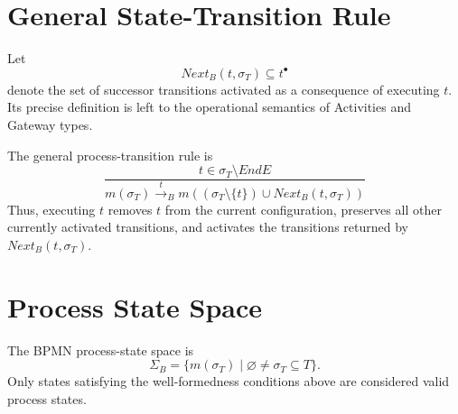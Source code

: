 \documentclass[11pt,a4paper]{article}
\newcommand{\EndE}{\mathit{EndE}}
\newcommand{\NextB}{\mathit{Next}_{B}}
\begin{document}
\section{General State-Transition Rule}

Let
\[
\boxed{
\NextB(t,\sigma_T)\subseteq t^{\bullet}
}
\]
denote the set of successor transitions activated as a consequence of executing $t$. Its precise definition is left to the operational semantics of Activities and Gateway types.

The general process-transition rule is
\[
\boxed{
\frac{t\in\sigma_T\setminus\EndE}
{m(\sigma_T)
\xrightarrow{\;t\;}_{B}
 m\!\left((\sigma_T\setminus\{t\})\cup\NextB(t,\sigma_T)\right)}
}
\tag{EXEC}
\]
Thus, executing $t$ removes $t$ from the current configuration, preserves all other currently activated transitions, and activates the transitions returned by $\NextB(t,\sigma_T)$.

\section{Process State Space}

The BPMN process-state space is
\[
\boxed{
\Sigma_B
=
\{m(\sigma_T)\mid \varnothing\neq\sigma_T\subseteq T\}.
}
\]
Only states satisfying the well-formedness conditions above are considered valid process states.
\end{document}
